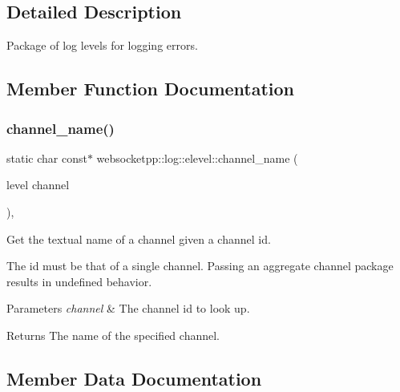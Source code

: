 \subsection{Detailed Description}
Package of log levels for logging errors. 

\subsection{Member Function Documentation}
\mbox{\label{structwebsocketpp_1_1log_1_1elevel_ac8eb65399a2ea6b782e0265a44618c0e}} 
\subsubsection{\texorpdfstring{channel\+\_\+name()}{channel\_name()}}
{\footnotesize\ttfamily static char const$\ast$ websocketpp\+::log\+::elevel\+::channel\+\_\+name (\begin{DoxyParamCaption}\item[{level}]{channel }\end{DoxyParamCaption})\hspace{0.3cm}{\ttfamily [inline]}, {\ttfamily [static]}}



Get the textual name of a channel given a channel id. 

The id must be that of a single channel. Passing an aggregate channel package results in undefined behavior.


\begin{DoxyParams}{Parameters}
{\em channel} & The channel id to look up.\\
\hline
\end{DoxyParams}
\begin{DoxyReturn}{Returns}
The name of the specified channel. 
\end{DoxyReturn}


\subsection{Member Data Documentation}
\mbox{\label{structwebsocketpp_1_1log_1_1elevel_aa909808e0fb142742a0ebd2dca54f517}} 
